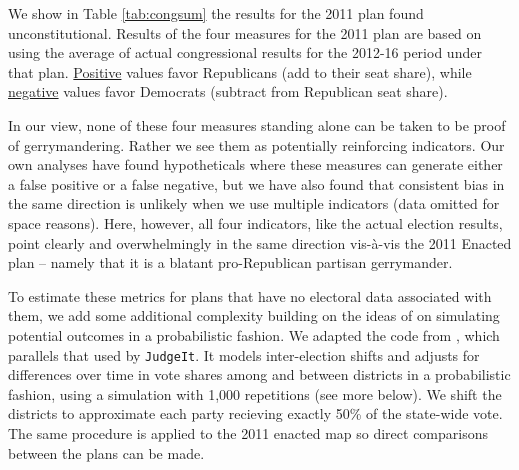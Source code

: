     We show in Table \ref{tab:congsum} the results for the 2011 plan found unconstitutional. Results of the four measures for the 2011 plan are based on using the average of actual congressional results for the 2012-16 period under that plan. \underline{Positive} values favor Republicans (add to their seat share), while \underline{negative} values favor Democrats (subtract from Republican seat share).   
\par
    In our view, none of these four measures standing alone can be taken to be proof of gerrymandering. Rather we see them as potentially reinforcing indicators. Our own analyses have found hypotheticals where these measures can generate either a false positive or a false negative, but we have also found that consistent bias in the same direction is unlikely when we use multiple indicators (data omitted for space reasons). Here, however, all four indicators, like the actual election results, point clearly and overwhelmingly in the same direction vis-à-vis the 2011 Enacted plan -- namely that it is a blatant pro-Republican partisan gerrymander.
\par
	To estimate these metrics for plans that have no electoral data associated with them, we add some additional complexity building on the ideas of \citet{GelmanKing1994_unifiedAJPS} on simulating potential outcomes in a probabilistic fashion. We adapted the code from \citet{Kastellec_et_al_2008_PS}, which parallels that used by \texttt{JudgeIt}. It models inter-election shifts and adjusts for differences over time in vote shares among and between districts in a probabilistic fashion, using a simulation with 1,000 repetitions (see more below). We shift the districts to approximate each party recieving exactly 50\% of the state-wide vote. The same procedure is applied to the 2011 enacted map so direct comparisons between the plans can be made.
\par
%
